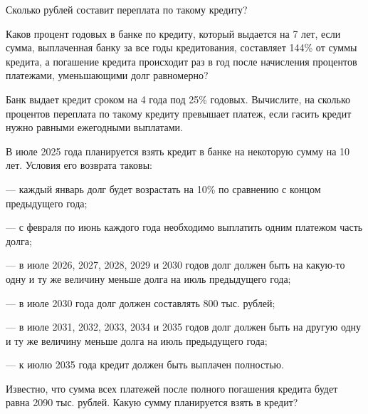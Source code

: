 Сколько рублей составит переплата по такому кредиту?


 Каков процент годовых в банке по кредиту, который выдается на 7 лет, если сумма, выплаченная банку за все годы кредитования, составляет 144\% от суммы кредита, а погашение
кредита происходит раз в год после начисления процентов платежами, уменьшающими долг
равномерно?



 Банк выдает кредит сроком на 4 года под 25\% годовых. Вычислите, на сколько процентов переплата по такому кредиту превышает платеж, если гасить кредит нужно равными ежегодными выплатами.

 В июле 2025 года планируется взять кредит в банке на некоторую сумму на 10 лет.
Условия его возврата таковы:

— каждый январь долг будет возрастать на 10\% по сравнению с концом предыдущего года;

— с февраля по июнь каждого года необходимо выплатить одним платежом часть долга;

— в июле 2026, 2027, 2028, 2029 и 2030 годов долг должен быть на какую-то одну и ту же
величину меньше долга на июль предыдущего года;

— в июле 2030 года долг должен составлять 800 тыс. рублей;

— в июле 2031, 2032, 2033, 2034 и 2035 годов долг должен быть на другую одну и ту же
величину меньше долга на июль предыдущего года;

— к июлю 2035 года кредит должен быть выплачен полностью.

Известно, что сумма всех платежей после полного погашения кредита будет равна 2090 тыс.
рублей. Какую сумму планируется взять в кредит?

